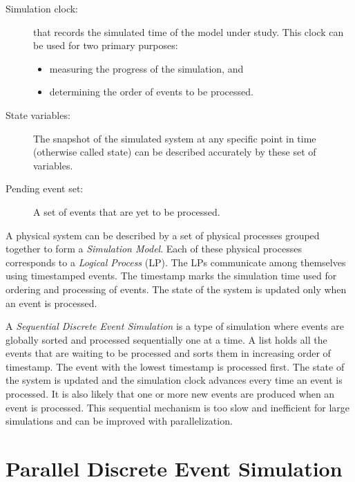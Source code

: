 \documentclass[11pt]{book}
\begin{document}
\begin{description}

\item[Simulation clock:] that records the simulated time of the model under study.  This clock can be used for
  two primary purposes:
  \begin{itemize}
  \item measuring the progress of the simulation, and
  \item determining the order of events to be processed.
  \end{itemize}
  
\item[State variables:] The snapshot of the simulated system at any specific point in time (otherwise called
  state) can be described accurately by these set of variables.
  
\item[Pending event set:] A set of events that are yet to be processed.

\end{description}

\noindent
A physical system can be described by a set of physical processes grouped together to form a \emph{Simulation
  Model}.  Each of these physical processes corresponds to a \emph{Logical Process} (LP).  The LPs communicate
among themselves using timestamped events.  The timestamp marks the simulation time used for ordering and
processing of events.  The state of the system is updated only when an event is processed.

A \emph{Sequential Discrete Event Simulation} is a type of simulation where events are globally sorted and
processed sequentially one at a time.  A list holds all the events that are waiting to be processed and sorts
them in increasing order of timestamp.  The event with the lowest timestamp is processed first.  The state of
the system is updated and the simulation clock advances every time an event is processed.  It is also likely
that one or more new events are produced when an event is processed.  This sequential mechanism is too slow
and inefficient for large simulations and can be improved with parallelization.

\section[\textsc{pdes}]{Parallel Discrete Event Simulation}\label{sec:pdes}
\end{document}
